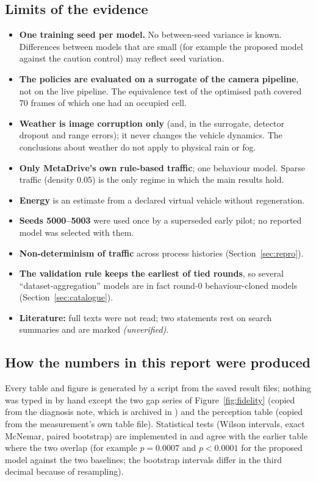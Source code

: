\subsection{Limits of the evidence}
\begin{itemize}
\item \textbf{One training seed per model.} No between-seed variance is known. Differences between models that are small (for example the proposed model against the caution control) may reflect seed variation.
\item \textbf{The policies are evaluated on a surrogate of the camera pipeline}, not on the live pipeline. The equivalence test of the optimised path covered 70 frames of which one had an occupied cell.
\item \textbf{Weather is image corruption only} (and, in the surrogate, detector dropout and range errors); it never changes the vehicle dynamics. The conclusions about weather do not apply to physical rain or fog.
\item \textbf{Only MetaDrive's own rule-based traffic}; one behaviour model. Sparse traffic (density 0.05) is the only regime in which the main results hold.
\item \textbf{Energy} is an estimate from a declared virtual vehicle without regeneration.
\item \textbf{Seeds 5000--5003} were used once by a superseded early pilot; no reported model was selected with them.
\item \textbf{Non-determinism of traffic} across process histories (Section~\ref{sec:repro}).
\item \textbf{The validation rule keeps the earliest of tied rounds}, so several ``dataset-aggregation'' models are in fact round-0 behaviour-cloned models (Section~\ref{sec:catalogue}).
\item \textbf{Literature:} full texts were not read; two statements rest on search summaries and are marked \emph{(unverified)}.
\end{itemize}

\subsection{How the numbers in this report were produced}
Every table and figure is generated by a script from the saved result files; nothing was typed in by hand except the two gap series of Figure~\ref{fig:fidelity} (copied from the diagnosis note, which is archived in ) and the perception table (copied from the measurement's own table file). Statistical tests (Wilson intervals, exact McNemar, paired bootstrap) are implemented in  and agree with the earlier table  where the two overlap
(for example $p=0.0007$ and $p<0.0001$ for the proposed model against the two baselines; the bootstrap intervals differ in the third decimal because of resampling).
